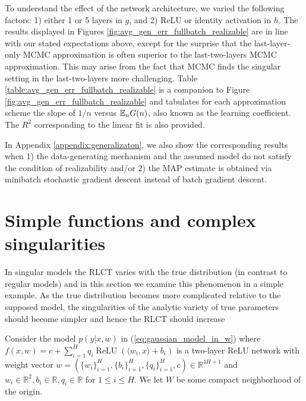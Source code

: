 \documentclass{article} %
\begin{document}
To understand the effect of the network architecture, we varied the following factors:  1) either 1 or 5 layers in $g$, and 2) ReLU or identity activation in $h$.
The results displayed in Figures \ref{fig:avg_gen_err_fullbatch_realizable} are in line with our stated expectations above, except for the surprise that the last-layer-only MCMC approximation is often superior to the last-two-layers MCMC approximation. This may arise from the fact that MCMC finds the singular setting in the last-two-layers more challenging. Table \ref{table:avg_gen_err_fullbatch_realizable} is a companion to Figure \ref{fig:avg_gen_err_fullbatch_realizable} and tabulates for each approximation scheme the slope of $1/n$ versus ${\mathbb{E}}_n G(n)$, also known as the learning coefficient. The $R^2$ corresponding to the linear fit is also provided. 


In Appendix \ref{appendix:generalizaton}, we also show the corresponding results when 1) the data-generating mechanism and the assumed model do not satisfy the condition of realizability and/or 2) the MAP estimate is obtained via minibatch stochastic gradient descent instead of batch gradient descent. 



\section{Simple functions and complex singularities}\label{section:simple_func}

In singular models the RLCT varies with the true distribution (in contrast to regular models) and in this section we examine this phenomenon in a simple example. As the true distribution becomes more complicated relative to the supposed model, the singularities of the analytic variety of true parameters should become simpler and hence the RLCT should increase \citep[\S 7.6]{watanabe_algebraic_2009}

Consider the model $p(y|x,w)$ in (\ref{eq:gaussian_model_in_w}) where
$
f(x,w) = c + \sum_{i=1}^H q_i \operatorname{ReLU}( \langle w_i, x \rangle + b_i )
$
is a two-layer ReLU network with weight vector $w = (\{w_i\}_{i=1}^H, \{b_i\}_{i=1}^H, \{q_i\}_{i=1}^H, c) \in \mathbb{R}^{4H+1}$ and $w_i \in \mathbb{R}^2, b_i \in \mathbb{R}, q_i \in \mathbb{R}$ for $1 \le i \le H$. We let $W$ be some compact neighborhood of the origin.
\end{document}

